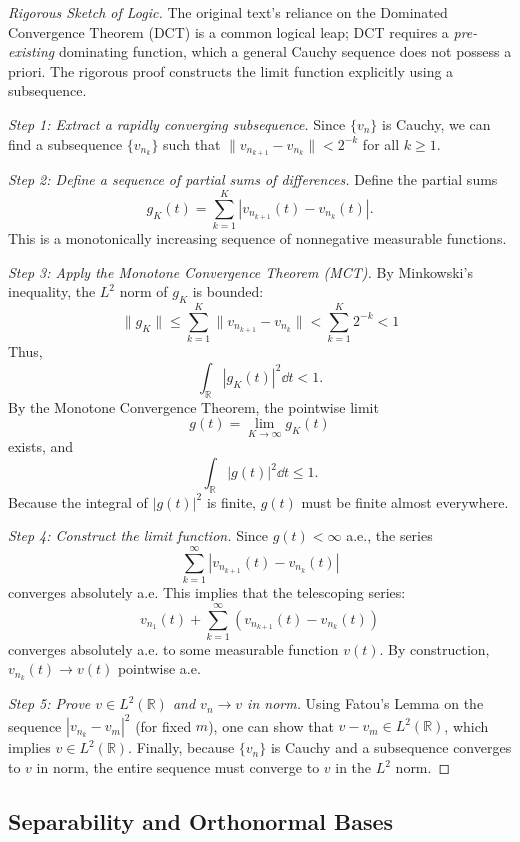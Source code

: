 \begin{proof}[Rigorous Sketch of Logic]
The original text's reliance on the Dominated Convergence Theorem (DCT) is a common logical leap; DCT requires a \textit{pre-existing} dominating function, which a general Cauchy sequence does not possess a priori. The rigorous proof constructs the limit function explicitly using a subsequence.

\textit{Step 1: Extract a rapidly converging subsequence.}
Since $\{v_n\}$ is Cauchy, we can find a subsequence $\{v_{n_k}\}$ such that $\|v_{n_{k+1}} - v_{n_k}\| < 2^{-k}$ for all $k \geq 1$.

\textit{Step 2: Define a sequence of partial sums of differences.}
Define the partial sums
\[
g_K(t) = \sum_{k=1}^K |v_{n_{k+1}}(t) - v_{n_k}(t)|.
\]
This is a monotonically increasing sequence of nonnegative measurable functions.

\textit{Step 3: Apply the Monotone Convergence Theorem (MCT).}
By Minkowski's inequality, the $L^2$ norm of $g_K$ is bounded:
\begin{equation}
\|g_K\| \leq \sum_{k=1}^K \|v_{n_{k+1}} - v_{n_k}\| < \sum_{k=1}^K 2^{-k} < 1
\end{equation}
Thus,
\[
\int_\mathbb{R} |g_K(t)|^2 \dd t < 1.
\]
By the Monotone Convergence Theorem, the pointwise limit \[
g(t) = \lim_{K \to \infty} g_K(t)
\] exists, and
\[
\int_\mathbb{R} |g(t)|^2 \dd t \leq 1.
\]
Because the integral of $|g(t)|^2$ is finite, $g(t)$ must be finite almost everywhere.

\textit{Step 4: Construct the limit function.}
Since $g(t) < \infty$ a.e., the series \[
\sum_{k=1}^\infty |v_{n_{k+1}}(t) - v_{n_k}(t)|
\] converges absolutely a.e. This implies that the telescoping series: \[
v_{n_1}(t) + \sum_{k=1}^\infty \left( v_{n_{k+1}}(t) - v_{n_k}(t) \right)
\] converges absolutely a.e. to some measurable function $v(t)$. By construction, $v_{n_k}(t) \to v(t)$ pointwise a.e.

\textit{Step 5: Prove $v \in L^2(\mathbb{R})$ and $v_n \to v$ in norm.}
Using Fatou's Lemma on the sequence $|v_{n_k} - v_m|^2$ (for fixed $m$), one can show that $v - v_m \in L^2(\mathbb{R})$, which implies $v \in L^2(\mathbb{R})$. Finally, because $\{v_n\}$ is Cauchy and a subsequence converges to $v$ in norm, the entire sequence must converge to $v$ in the $L^2$ norm.
\end{proof}

\subsection{Separability and Orthonormal Bases}

